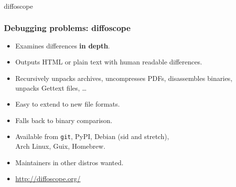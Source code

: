 \documentclass[14pt]{beamer}
\begin{document}
{
\begin{frame}{diffoscope}
 \frametitle{Debugging problems: diffoscope}

 \begin{itemize}
  \item Examines differences \textbf{in depth}.
  \item Outputs HTML or plain text with human readable differences.
  \item Recursively unpacks archives, uncompresses PDFs, disassembles
  binaries, unpacks Gettext files, …
  \item Easy to extend to new file formats.
  \item Falls back to binary comparison.
  \item Available from \texttt{git}, PyPI, Debian (sid and stretch), \\
   Arch Linux, Guix, Homebrew.
  \item Maintainers in other distros wanted.
  \item \url{http://diffoscope.org/}
 \end{itemize}
\end{frame}
}
\end{document}

